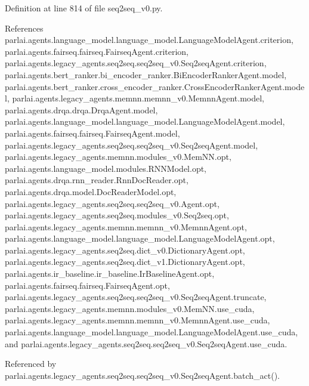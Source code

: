 Definition at line 814 of file seq2seq\+\_\+v0.\+py.



References parlai.\+agents.\+language\+\_\+model.\+language\+\_\+model.\+Language\+Model\+Agent.\+criterion, parlai.\+agents.\+fairseq.\+fairseq.\+Fairseq\+Agent.\+criterion, parlai.\+agents.\+legacy\+\_\+agents.\+seq2seq.\+seq2seq\+\_\+v0.\+Seq2seq\+Agent.\+criterion, parlai.\+agents.\+bert\+\_\+ranker.\+bi\+\_\+encoder\+\_\+ranker.\+Bi\+Encoder\+Ranker\+Agent.\+model, parlai.\+agents.\+bert\+\_\+ranker.\+cross\+\_\+encoder\+\_\+ranker.\+Cross\+Encoder\+Ranker\+Agent.\+model, parlai.\+agents.\+legacy\+\_\+agents.\+memnn.\+memnn\+\_\+v0.\+Memnn\+Agent.\+model, parlai.\+agents.\+drqa.\+drqa.\+Drqa\+Agent.\+model, parlai.\+agents.\+language\+\_\+model.\+language\+\_\+model.\+Language\+Model\+Agent.\+model, parlai.\+agents.\+fairseq.\+fairseq.\+Fairseq\+Agent.\+model, parlai.\+agents.\+legacy\+\_\+agents.\+seq2seq.\+seq2seq\+\_\+v0.\+Seq2seq\+Agent.\+model, parlai.\+agents.\+legacy\+\_\+agents.\+memnn.\+modules\+\_\+v0.\+Mem\+N\+N.\+opt, parlai.\+agents.\+language\+\_\+model.\+modules.\+R\+N\+N\+Model.\+opt, parlai.\+agents.\+drqa.\+rnn\+\_\+reader.\+Rnn\+Doc\+Reader.\+opt, parlai.\+agents.\+drqa.\+model.\+Doc\+Reader\+Model.\+opt, parlai.\+agents.\+legacy\+\_\+agents.\+seq2seq.\+seq2seq\+\_\+v0.\+Agent.\+opt, parlai.\+agents.\+legacy\+\_\+agents.\+seq2seq.\+modules\+\_\+v0.\+Seq2seq.\+opt, parlai.\+agents.\+legacy\+\_\+agents.\+memnn.\+memnn\+\_\+v0.\+Memnn\+Agent.\+opt, parlai.\+agents.\+language\+\_\+model.\+language\+\_\+model.\+Language\+Model\+Agent.\+opt, parlai.\+agents.\+legacy\+\_\+agents.\+seq2seq.\+dict\+\_\+v0.\+Dictionary\+Agent.\+opt, parlai.\+agents.\+legacy\+\_\+agents.\+seq2seq.\+dict\+\_\+v1.\+Dictionary\+Agent.\+opt, parlai.\+agents.\+ir\+\_\+baseline.\+ir\+\_\+baseline.\+Ir\+Baseline\+Agent.\+opt, parlai.\+agents.\+fairseq.\+fairseq.\+Fairseq\+Agent.\+opt, parlai.\+agents.\+legacy\+\_\+agents.\+seq2seq.\+seq2seq\+\_\+v0.\+Seq2seq\+Agent.\+truncate, parlai.\+agents.\+legacy\+\_\+agents.\+memnn.\+modules\+\_\+v0.\+Mem\+N\+N.\+use\+\_\+cuda, parlai.\+agents.\+legacy\+\_\+agents.\+memnn.\+memnn\+\_\+v0.\+Memnn\+Agent.\+use\+\_\+cuda, parlai.\+agents.\+language\+\_\+model.\+language\+\_\+model.\+Language\+Model\+Agent.\+use\+\_\+cuda, and parlai.\+agents.\+legacy\+\_\+agents.\+seq2seq.\+seq2seq\+\_\+v0.\+Seq2seq\+Agent.\+use\+\_\+cuda.



Referenced by parlai.\+agents.\+legacy\+\_\+agents.\+seq2seq.\+seq2seq\+\_\+v0.\+Seq2seq\+Agent.\+batch\+\_\+act().


